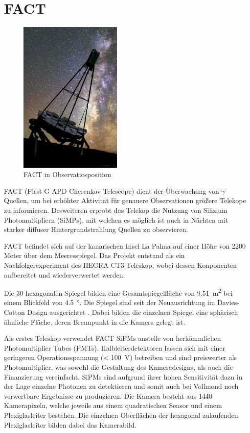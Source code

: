 \chapter{FACT}
\begin{figure}
  \includegraphics[width=0.45\textwidth]{./images/FACT.jpg}
  \caption{FACT in Observatiosposition \cite{factpic}}
  \label{fig:observ}
\end{figure}
FACT (First G-APD Cherenkov Telescope) dient der Überwachung von $\gamma$-Quellen, um bei erhöhter Aktivität für genauere Observationen größere Telekope zu informieren. 
Desweiteren erprobt das Telekop die Nutzung von Silizium Photomultipliern (SiMPs), mit welchen es möglich ist auch in Nächten mit starker diffuser Hintergrundstrahlung Quellen zu observieren. 

FACT befindet sich auf der kanarischen Insel La Palma auf einer Höhe von 2200 Meter über dem Meeresspiegel.
Das Projekt entstand als ein Nachfolgerexperiment des HEGRA CT3 Teleskop, wobei dessen Konponenten aufbereitet und wiederverwertet werden.

Die 30 hexagonalen Spiegel bilden eine Gesamtspiegelfläche von \SI{9.51}{\meter\squared} bei einem Blickfeld von \SI{4.5}{\degree}. 
Die Spiegel sind seit der Neuausrichtung im Davies-Cotton Design ausgerichtet \cite{design-detec}.
Dabei bilden die einzelnen Spiegel eine sphärisch ähnliche Fläche, deren Brennpunkt in die Kamera gelegt ist.

Als erstes Teleskop verwendet FACT SiPMs anstelle von herkömmlichen Photomultiplier Tubes (PMTs). 
Halbleiterdetektoren lassen sich mit einer geringeren Operationsspannung (< \SI{100}{\volt}) betreiben und sind preiswerter als Photomultiplier, was sowohl die Gestaltung des Kameradesigns, als auch die Finanzierung vereinfacht. 
SiPMs sind aufgrund ihrer hohen Sensitivität dazu in der Lage einzelne Photonen zu detektieren und somit auch bei Vollmond noch verwertbare Ergebnisse zu produzieren.
Die Kamera besteht aus 1440 Kamerapixeln, welche jeweils aus einem quadratischen Sensor und einem Plexiglasleiter bestehen. Die einzelnen Oberflächen der hexagonal zulaufenden Plexiglasleiter bilden dabei das Kamerabild.

